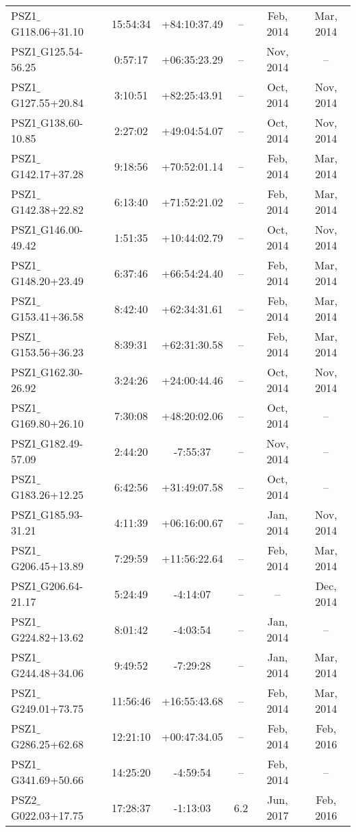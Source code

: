 \documentclass[apj, revtex4]{emulateapj}
\begin{document}
\begin{longtable*}{lccccc}
	PSZ1$\_$G118.06+31.10 & 15:54:34 & +84:10:37.49 & -- & Feb, 2014 & Mar, 2014 \\
	PSZ1$\_$G125.54-56.25 & 0:57:17 & +06:35:23.29 & -- & Nov, 2014 & -- \\
	PSZ1$\_$G127.55+20.84 & 3:10:51 & +82:25:43.91 & -- & Oct, 2014 & Nov, 2014 \\
	PSZ1$\_$G138.60-10.85 & 2:27:02 & +49:04:54.07 & -- & Oct, 2014 & Nov, 2014 \\
	PSZ1$\_$G142.17+37.28 & 9:18:56 & +70:52:01.14 & -- & Feb, 2014 & Mar, 2014 \\
	PSZ1$\_$G142.38+22.82 & 6:13:40 & +71:52:21.02 & -- & Feb, 2014 & Mar, 2014 \\
	PSZ1$\_$G146.00-49.42 & 1:51:35 & +10:44:02.79 & -- & Oct, 2014 & Nov, 2014 \\
	PSZ1$\_$G148.20+23.49 & 6:37:46 & +66:54:24.40 & -- & Feb, 2014 & Mar, 2014 \\
	PSZ1$\_$G153.41+36.58 & 8:42:40 & +62:34:31.61 & -- & Feb, 2014 & Mar, 2014 \\
	PSZ1$\_$G153.56+36.23 & 8:39:31 & +62:31:30.58 & -- & Feb, 2014 & Mar, 2014 \\
	PSZ1$\_$G162.30-26.92 & 3:24:26 & +24:00:44.46 & -- & Oct, 2014 & Nov, 2014 \\
	PSZ1$\_$G169.80+26.10 & 7:30:08 & +48:20:02.06 & -- & Oct, 2014 & -- \\
	PSZ1$\_$G182.49-57.09 & 2:44:20 & -7:55:37 & -- & Nov, 2014 & -- \\
	PSZ1$\_$G183.26+12.25 & 6:42:56 & +31:49:07.58 & -- & Oct, 2014 & -- \\
	PSZ1$\_$G185.93-31.21 & 4:11:39 & +06:16:00.67 & -- & Jan, 2014 & Nov, 2014 \\
	PSZ1$\_$G206.45+13.89 & 7:29:59 & +11:56:22.64 & -- & Feb, 2014 & Mar, 2014 \\
	PSZ1$\_$G206.64-21.17 & 5:24:49 & -4:14:07 & -- & -- & Dec, 2014 \\
	PSZ1$\_$G224.82+13.62 & 8:01:42 & -4:03:54 & -- & Jan, 2014 & -- \\
	PSZ1$\_$G244.48+34.06 & 9:49:52 & -7:29:28 & -- & Jan, 2014 & Mar, 2014 \\
	PSZ1$\_$G249.01+73.75 & 11:56:46 & +16:55:43.68 & -- & Feb, 2014 & Mar, 2014 \\
	PSZ1$\_$G286.25+62.68 & 12:21:10 & +00:47:34.05 & -- & Feb, 2014 & Feb, 2016 \\
	PSZ1$\_$G341.69+50.66 & 14:25:20 & -4:59:54 & -- & Feb, 2014 & -- \\
	PSZ2$\_$G022.03+17.75 & 17:28:37 & -1:13:03 & 6.2 & Jun, 2017 & Feb, 2016 \\

\end{longtable*}
\end{document}
